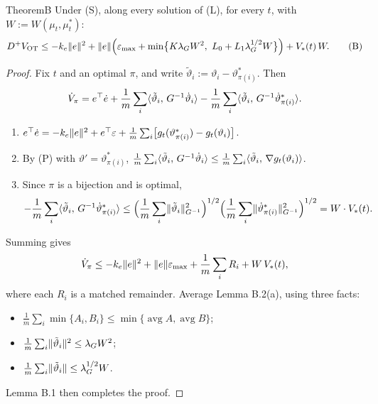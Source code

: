 \begin{thm}{Theorem}{B}
Under (S), along every solution of (L), for every $t$, with $W:=W(\mu_t,\mu^*_t)$:
\begin{equation}\label{eq:thmB:B}
  D^+\VOT\le-k_e\norm{e}^2+\norm{e}\Bigl(\varepsilon_{\max}
    +\min\bigl\{K\lambda_GW^2,\ L_0+L_1\lambda_G^{1/2}W\bigr\}\Bigr)+V_*(t)\,W.
  \tag{B}
\end{equation}
\end{thm}


\begin{proof}
Fix $t$ and an optimal $\pi$, and write $\tilde\vartheta_i:=\vartheta_i-\vartheta^*_{\pi(i)}$. Then
\[
  \dot V_\pi=e^\top\dot e+\frac1m\sum_i\langle \tilde\vartheta_i,\, G^{-1}\dot\vartheta_i\rangle
    -\frac1m\sum_i\langle \tilde\vartheta_i,\, G^{-1}\dot\vartheta^*_{\pi(i)}\rangle.
\]
\begin{enumerate}[label=(\alph*)]
\item $e^\top\dot e=-k_e\lVert e\rVert^2+e^\top\varepsilon+\frac1m\sum_i\bigl[g_t(\vartheta^*_{\pi(i)})-g_t(\vartheta_i)\bigr]$.
\item By (P) with $\vartheta'=\vartheta^*_{\pi(i)}$,
  $\frac1m\sum_i\langle \tilde\vartheta_i,\, G^{-1}\dot\vartheta_i\rangle\le\frac1m\sum_i\langle \tilde\vartheta_i,\, \nabla g_t(\vartheta_i)\rangle$.
\item Since $\pi$ is a bijection and is optimal,
  \[
    -\frac1m\sum_i\langle \tilde\vartheta_i,\, G^{-1}\dot\vartheta^*_{\pi(i)}\rangle
    \le\Bigl(\frac1m\sum_i\lVert \tilde\vartheta_i\rVert^2_{G^{-1}}\Bigr)^{1/2}
       \Bigl(\frac1m\sum_i\lVert \dot\vartheta^*_{\pi(i)}\rVert^2_{G^{-1}}\Bigr)^{1/2}
    =W\cdot V_*(t).
  \]
\end{enumerate}
Summing gives
\[
  \dot V_\pi\le-k_e\lVert e\rVert^2+\lVert e\rVert\varepsilon_{\max}+\frac1m\sum_iR_i+W\,V_*(t),
\]
where each $R_i$ is a matched remainder. Average Lemma B.2(a), using three facts:
\begin{itemize}
\item $\frac1m\sum_i\min\{A_i,B_i\}\le\min\{\operatorname{avg}A,\operatorname{avg}B\}$;
\item $\frac1m\sum_i\lVert \tilde\vartheta_i\rVert^2\le\lambda_GW^2$;
\item $\frac1m\sum_i\lVert \tilde\vartheta_i\rVert\le\lambda_G^{1/2}W$.
\end{itemize}
Lemma B.1 then completes the proof.
\end{proof}

